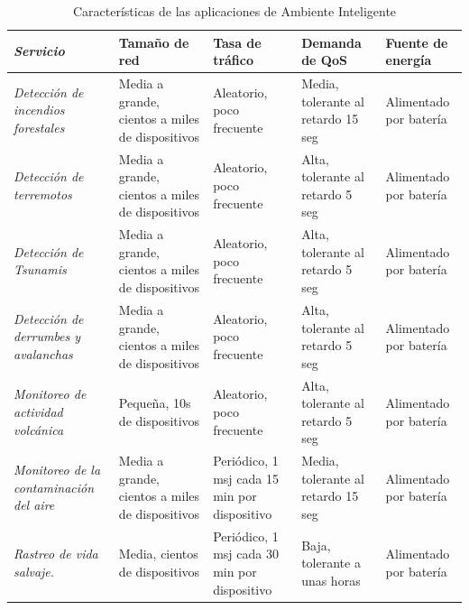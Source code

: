 \begin{table}
\caption{Características de las aplicaciones de Ambiente Inteligente}
\label{tab:smartenv}
\centering
\begin{tabular}{*{5}{m{3cm}}} \\ 
\textbf{\textit{Servicio}} & \textbf{Tamaño de red} & \textbf{Tasa de tráfico} & \textbf{Demanda de QoS} & \textbf{Fuente de energía} \\ \hline 
\textit{Detección de incendios forestales}  & \footnotesize{ Media a grande, cientos a miles de dispositivos } & \footnotesize{ Aleatorio, poco frecuente } & \footnotesize{ Media, tolerante al retardo 15 seg } & \footnotesize{ Alimentado por batería } \\ \hline 
\textit{Detección de terremotos}  & \footnotesize{ Media a grande, cientos a miles de dispositivos } & \footnotesize{ Aleatorio, poco frecuente } & \footnotesize{ Alta, tolerante al retardo 5 seg } & \footnotesize{ Alimentado por batería } \\ \hline 
\textit{Detección de Tsunamis}  & \footnotesize{ Media a grande, cientos a miles de dispositivos } & \footnotesize{ Aleatorio, poco frecuente } & \footnotesize{ Alta, tolerante al retardo 5 seg } & \footnotesize{ Alimentado por batería } \\ \hline 
\textit{Detección de derrumbes y avalanchas}  & \footnotesize{ Media a grande, cientos a miles de dispositivos } & \footnotesize{ Aleatorio, poco frecuente } & \footnotesize{ Alta, tolerante al retardo 5 seg } & \footnotesize{ Alimentado por batería } \\ \hline 
\textit{Monitoreo de actividad volcánica}  & \footnotesize{ Pequeña, 10s de dispositivos } & \footnotesize{ Aleatorio, poco frecuente } & \footnotesize{ Alta, tolerante al retardo 5 seg } & \footnotesize{ Alimentado por batería } \\ \hline 
\textit{Monitoreo de la contaminación del aire } & \footnotesize{ Media a grande, cientos a miles de dispositivos } & \footnotesize{ Periódico, 1 msj cada 15 min por dispositivo } & \footnotesize{ Media, tolerante al retardo 15 seg } & \footnotesize{ Alimentado por batería } \\ \hline 
\textit{Rastreo de vida salvaje.}  & \footnotesize{ Media, cientos de dispositivos } & \footnotesize{ Periódico, 1 msj cada 30 min por dispositivo } & \footnotesize{ Baja, tolerante a unas horas } & \footnotesize{ Alimentado por batería } \\ 
\end{tabular}
\end{table}

